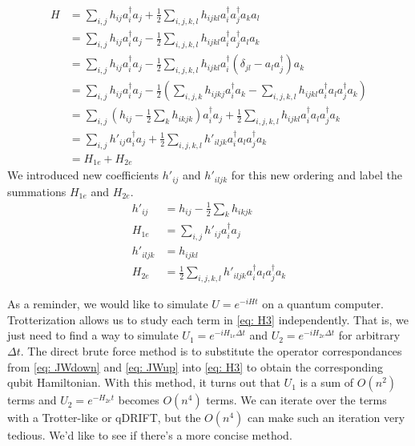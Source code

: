 \begin{equation}
    \begin{split}
        H &= \sum_{i, j} h_{ij}a^\dag_ia_j + \frac{1}{2}\sum_{i,j,k,l} h_{ijkl}a^\dag_ia^\dag_ja_ka_l \\
        &= \sum_{i, j} h_{ij}a^\dag_ia_j - \frac{1}{2}\sum_{i,j,k,l} h_{ijkl}a^\dag_ia^\dag_ja_la_k \\
        &= \sum_{i, j} h_{ij}a^\dag_ia_j - \frac{1}{2}\sum_{i,j,k,l} h_{ijkl}a^\dag_i(\delta_{jl} - a_la^\dag_j)a_k \\
        &= \sum_{i, j} h_{ij}a^\dag_ia_j - \frac{1}{2}\left(\sum_{i, j, k}h_{ijkj}a^\dag_ia_k - \sum_{i,j,k,l} h_{ijkl}a^\dag_ia_la^\dag_ja_k\right) \\
        &= \sum_{i, j} (h_{ij} - \frac{1}{2}\sum_k h_{ikjk})a^\dag_ia_j + \frac{1}{2}\sum_{i,j,k,l} h_{ijkl}a^\dag_ia_la^\dag_ja_k \\
        &= \sum_{i, j} h'_{ij}a^\dag_ia_j + \frac{1}{2}\sum_{i,j,k,l} h'_{iljk}a^\dag_ia_la^\dag_ja_k \\
        &= H_{1e} + H_{2e}
    \end{split}
    \label{eq: H3}
\end{equation}
We introduced new coefficients $h'_{ij}$ and $h'_{iljk}$ for this new ordering and label the summations $H_{1e}$ and $H_{2e}$.
\begin{equation}
    \begin{split}
        h'_{ij} &= h_{ij} - \frac{1}{2}\sum_k h_{ikjk} \\
        H_{1e} &= \sum_{i, j} h'_{ij}a^\dag_ia_j \\
        h'_{iljk} &= h_{ijkl} \\
        H_{2e} &= \frac{1}{2}\sum_{i,j,k,l} h'_{iljk}a^\dag_ia_la^\dag_ja_k
    \end{split}
\end{equation}

As a reminder, we would like to simulate $U = e^{-iHt}$ on a quantum computer. Trotterization allows us to study each term in \eqref{eq: H3} independently. That is, we just need to find a way to simulate $U_1 = e^{-iH_{1e}\Delta t}$ and $U_2 = e^{-iH_{2e}\Delta t}$ for arbitrary $\Delta t$. The direct brute force method is to substitute the operator correspondances from \eqref{eq: JWdown} and \eqref{eq: JWup} into \eqref{eq: H3} to obtain the corresponding qubit Hamiltonian. With this method, it turns out that $U_1$ is a sum of $O(n^2)$ terms and $U_2 = e^{-H_{2e}t}$ becomes $O(n^4)$ terms. We can iterate over the terms with a Trotter-like or qDRIFT, but the $O(n^4)$ can make such an iteration very tedious. We'd like to see if there's a more concise method.

